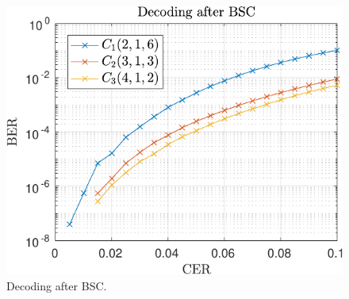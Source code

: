 


\begin{figure}
\centering
\includegraphics[scale=1]{../figures/randomErrors-crop.pdf} 
\caption{Decoding after BSC.}
\end{figure}

